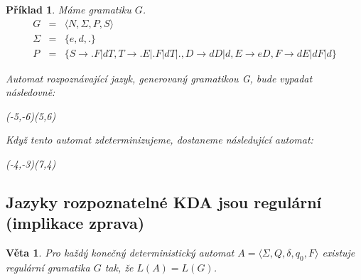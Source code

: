 \documentclass[10pt, a4paper, titlepage]{article}
\theoremstyle{note}
\newtheorem{veta}{\textbf{Věta}}
\newtheorem{priklad}{\textbf{Příklad}}
\begin{document}
\begin{priklad}
Máme gramatiku $G$.
\begin{eqnarray*}
G &=& \langle N,\Sigma,P,S \rangle \\
\Sigma &=& \lbrace e,d,. \rbrace \\
P &=& \lbrace S \rightarrow .F | dT , T \rightarrow .E|.F|dT|. , D \rightarrow dD|d , E \rightarrow eD , F \rightarrow dE|dF|d \rbrace
\end{eqnarray*}

Automat rozpoznávající jazyk, generovaný gramatikou G, bude vypadat následovně:

\begin{center}
\begin{VCPicture}{(-5,-6)(5,6)}
\end{VCPicture}
\end{center}

Když tento automat zdeterminizujeme, dostaneme následující automat:

\begin{center}
\begin{VCPicture}{(-4,-3)(7,4)}
\end{VCPicture}
\end{center}

\end{priklad}

\subsection{Jazyky rozpoznatelné KDA jsou regulární (implikace zprava)}

\begin{veta} 
Pro každý konečný deterministický automat $A = \langle \Sigma,Q,\delta,q_0,F \rangle$ existuje regulární gramatika $G$ tak, že $L(A)=L(G)$.
\end{veta}
\end{document}
